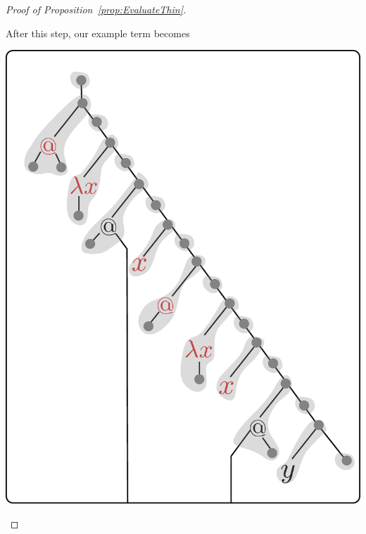 \begin{proof}[Proof of Proposition~\ref{prop:EvaluateThin}]
\begin{enumerate}
 After this step, our example term becomes    
\begin{center}
\includegraphics[scale=.4]{pictures/running-thin-4}
\end{center}


\end{enumerate}
\end{proof}
